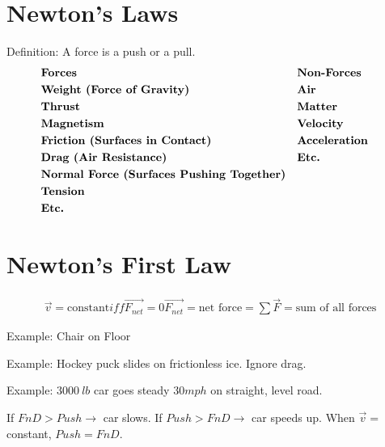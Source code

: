 \section{Newton's Laws}
	Definition: A force is a push or a pull.
	\begin{align}
		&\textbf{Forces}& &\textbf{Non-Forces}& \notag \\
		&\textbf{Weight (Force of Gravity)}& &\textbf{Air}& \notag \\
		&\textbf{Thrust}& &\textbf{Matter}& \notag \\
		&\textbf{Magnetism}& &\textbf{Velocity}& \notag \\
		&\textbf{Friction (Surfaces in Contact)}& &\textbf{Acceleration}& \notag \\
		&\textbf{Drag (Air Resistance)}& &\textbf{Etc.}& \notag \\
		&\textbf{Normal Force (Surfaces Pushing Together)}& && \notag \\
		&\textbf{Tension}& && \notag \\
		&\textbf{Etc.}& && \notag \\
	\end{align}

\section{Newton's First Law}
	\begin{align}
		\vec{v} = \text{constant}
		iff
		\vec{F_{net}} = 0
		\vec{F_{net}} = \text{net force}
		= \sum \vec{F} = \text{sum of all forces}
	\end{align}

	Example: Chair on Floor


	Example: Hockey puck slides on frictionless ice. Ignore drag.


	Example: $3000 \ lb$ car goes steady $30 mph$ on straight, level road.


	If $FnD > Push \to$ car slows.
	If $Push > FnD \to$ car speeds up.
	When $\vec{v} =$ constant, $Push = FnD$.
